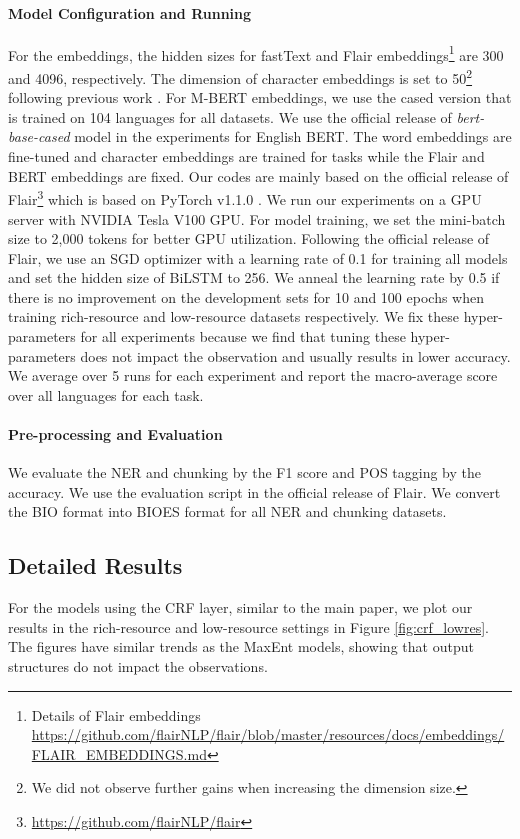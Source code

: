 \documentclass[11pt,a4paper]{article}
\begin{document}
\paragraph{Model Configuration and Running} For the embeddings, the hidden sizes for fastText and Flair embeddings\footnote{Details of Flair embeddings \url{https://github.com/flairNLP/flair/blob/master/resources/docs/embeddings/FLAIR_EMBEDDINGS.md}} are 300 and 4096, respectively. The dimension of character embeddings is set to 50\footnote{We did not observe further gains when increasing the dimension size.} following previous work \cite{lample-etal-2016-neural}. For M-BERT embeddings, we use the cased version that is trained on 104 languages for all datasets. We use the official release of \textit{bert-base-cased} model in the experiments for English BERT. The word embeddings are fine-tuned and character embeddings are trained for tasks while the Flair and BERT embeddings are fixed. Our codes are mainly based on the official release of Flair\footnote{\url{https://github.com/flairNLP/flair}} which is based on PyTorch v1.1.0 \cite{NEURIPS2019_9015}. We run our experiments on a GPU server with NVIDIA Tesla V100 GPU. For model training, we set the mini-batch size to 2,000 tokens for better GPU utilization. Following the official release of Flair, we use an SGD optimizer with a learning rate of 0.1 for training all models and set the hidden size of BiLSTM to 256. We anneal the learning rate by 0.5 if there is no improvement on the development sets for 10 and 100 epochs when training rich-resource and low-resource datasets respectively. We fix these hyper-parameters for all experiments because we find that tuning these hyper-parameters does not impact the observation and usually results in lower accuracy. We average over 5 runs for each experiment and report the macro-average score over all languages for each task. 

\paragraph{Pre-processing and Evaluation} We evaluate the NER and chunking by the F1 score and POS tagging by the accuracy. We use the evaluation script in the official release of Flair. We convert the BIO format into BIOES format for all NER and chunking datasets.




\subsection{Detailed Results}
For the models using the CRF layer, similar to the main paper, we plot our results in the rich-resource and low-resource settings in Figure \ref{fig:crf_lowres}. The figures have similar trends as the MaxEnt models, showing that output structures do not impact the observations.
\end{document}

